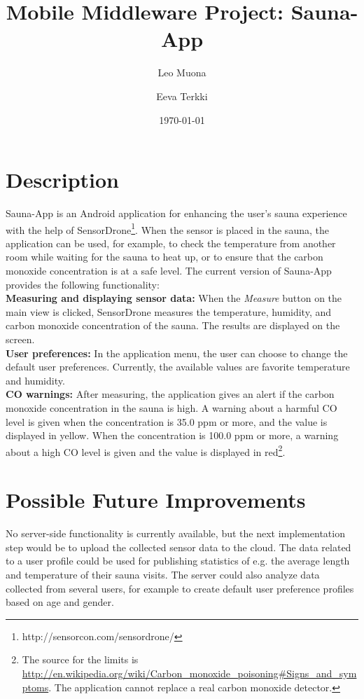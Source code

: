 \documentclass[11pt]{article}
\title{\textbf{Mobile Middleware Project: Sauna-App}}
\author{Leo Muona \and
		Eeva Terkki}
\date{\today}
\begin{document}
\maketitle
\thispagestyle{empty}

\section{Description}


Sauna-App is an Android application for enhancing the user's sauna experience with the help of SensorDrone\footnote{http://sensorcon.com/sensordrone/}. When the sensor is placed in the sauna, the application can be used, for example, to check the temperature from another room while waiting for the sauna to heat up, or to ensure that the carbon monoxide concentration is at a safe level. The current version of Sauna-App provides the following functionality:\\

\noindent\textbf{Measuring and displaying sensor data:} When the \textit{Measure} button on the main view is clicked, SensorDrone measures the temperature, humidity, and carbon monoxide concentration of the sauna. The results are displayed on the screen. \\

\noindent\textbf{User preferences:} In the application menu, the user can choose to change the default user preferences. Currently, the available values are favorite temperature and humidity.  \\

\noindent\textbf{CO warnings:} After measuring, the application gives an alert if the carbon monoxide concentration in the sauna is high. A warning about a harmful CO level is given when the concentration is 35.0 ppm or more, and the value is displayed in yellow. When the concentration is 100.0 ppm or more, a warning about a high CO level is given and the value is displayed in red\footnote{The source for the limits is \url{http://en.wikipedia.org/wiki/Carbon_monoxide_poisoning\#Signs_and_symptoms}. The application cannot replace a real carbon monoxide detector.}.


\section{Possible Future Improvements}
No server-side functionality is currently available, but the next implementation step would be to upload the collected sensor data to the cloud. The data related to a user profile could be used for publishing statistics of e.g. the average length and temperature of their sauna visits. The server could also analyze data collected from several users, for example to create default user preference profiles based on age and gender. 
\end{document}
